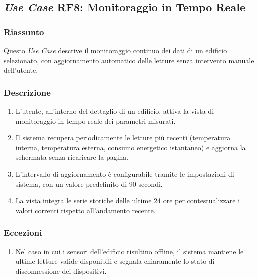\subsection*{\textit{Use Case} RF8: Monitoraggio in Tempo Reale}
        \subsubsection*{Riassunto}
            Questo \textit{Use Case} descrive il monitoraggio continuo dei dati di un edificio selezionato, con aggiornamento automatico delle letture senza intervento manuale dell'utente.
        \subsubsection*{Descrizione}
            \begin{enumerate}
                \item L'utente, all'interno del dettaglio di un edificio, attiva la vista di monitoraggio in tempo reale dei parametri misurati.
                \item Il sistema recupera periodicamente le letture più recenti (temperatura interna, temperatura esterna, consumo energetico istantaneo) e aggiorna la schermata senza ricaricare la pagina.
                \item L'intervallo di aggiornamento è configurabile tramite le impostazioni di sistema, con un valore predefinito di 90 secondi.
                \item La vista integra le serie storiche delle ultime 24 ore per contestualizzare i valori correnti rispetto all'andamento recente.
            \end{enumerate}
        \subsubsection*{Eccezioni}
            \begin{enumerate}
                \item Nel caso in cui i sensori dell'edificio risultino offline, il sistema mantiene le ultime letture valide disponibili e segnala chiaramente lo stato di disconnessione dei dispositivi.
            \end{enumerate}
\newpage
